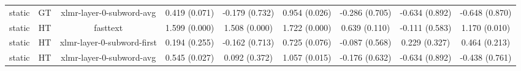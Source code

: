 \begin{sidewaystable}[htb]
\begin{tabular}{@{}ccccccccc@{}}
        static & GT & xlmr-layer-0-subword-avg & 0.419 (0.071) & -0.179 (0.732) & 0.954 (0.026) & -0.286 (0.705) & -0.634 (0.892) & -0.648 (0.870) \\
        static & HT & fasttext & 1.599 (0.000) & 1.508 (0.000) & 1.722 (0.000) & 0.639 (0.110) & -0.111 (0.583) & 1.170 (0.010) \\
        static & HT & xlmr-layer-0-subword-first & 0.194 (0.255) & -0.162 (0.713) & 0.725 (0.076) & -0.087 (0.568) & 0.229 (0.327) & 0.464 (0.213) \\
        static & HT & xlmr-layer-0-subword-avg & 0.545 (0.027) & 0.092 (0.372) & 1.057 (0.015) & -0.176 (0.632) & -0.634 (0.892) & -0.438 (0.761) \\
        \bottomrule
    \end{tabular}
\end{sidewaystable}